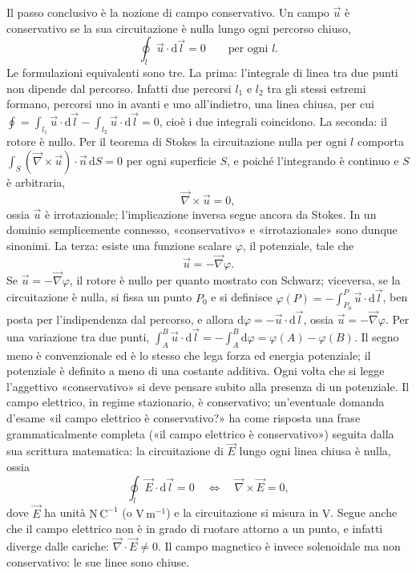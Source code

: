 \documentclass[11pt,a4paper]{article}
\newcommand{\nab}{\vec{\nabla}}
\newcommand{\dd}{\mathrm{d}}
\begin{document}
Il passo conclusivo è la nozione di campo conservativo. Un campo $\vec u$ è conservativo se la sua circuitazione è nulla lungo ogni percorso chiuso,
\[
\oint_l\vec u\cdot\dd\vec l=0\qquad\text{per ogni }l .
\]
Le formulazioni equivalenti sono tre. La prima: l'integrale di linea tra due punti non dipende dal percorso. Infatti due percorsi $l_1$ e $l_2$ tra gli stessi estremi formano, percorsi uno in avanti e uno all'indietro, una linea chiusa, per cui $\oint=\int_{l_1}\vec u\cdot\dd\vec l-\int_{l_2}\vec u\cdot\dd\vec l=0$, cioè i due integrali coincidono. La seconda: il rotore è nullo. Per il teorema di Stokes la circuitazione nulla per ogni $l$ comporta $\int_S(\nab\times\vec u)\cdot\vec n\,\dd S=0$ per ogni superficie $S$, e poiché l'integrando è continuo e $S$ è arbitraria,
\[
\nab\times\vec u=0 ,
\]
ossia $\vec u$ è irrotazionale; l'implicazione inversa segue ancora da Stokes. In un dominio semplicemente connesso, «conservativo» e «irrotazionale» sono dunque sinonimi. La terza: esiste una funzione scalare $\varphi$, il potenziale, tale che
\[
\vec u=-\nab\varphi .
\]
Se $\vec u=-\nab\varphi$, il rotore è nullo per quanto mostrato con Schwarz; viceversa, se la circuitazione è nulla, si fissa un punto $P_0$ e si definisce $\varphi(P)=-\int_{P_0}^{P}\vec u\cdot\dd\vec l$, ben posta per l'indipendenza dal percorso, e allora $\dd\varphi=-\vec u\cdot\dd\vec l$, ossia $\vec u=-\nab\varphi$. Per una variazione tra due punti, $\int_A^B\vec u\cdot\dd\vec l=-\int_A^B\dd\varphi=\varphi(A)-\varphi(B)$. Il segno meno è convenzionale ed è lo stesso che lega forza ed energia potenziale; il potenziale è definito a meno di una costante additiva. Ogni volta che si legge l'aggettivo «conservativo» si deve pensare subito alla presenza di un potenziale. Il campo elettrico, in regime stazionario, è conservativo; un'eventuale domanda d'esame «il campo elettrico è conservativo?» ha come risposta una frase grammaticalmente completa («il campo elettrico è conservativo») seguita dalla sua scrittura matematica: la circuitazione di $\vec E$ lungo ogni linea chiusa è nulla, ossia
\[
\oint_l\vec E\cdot\dd\vec l=0\quad\Longleftrightarrow\quad\nab\times\vec E=0 ,
\]
dove $\vec E$ ha unità $\mathrm{N\,C^{-1}}$ (o $\mathrm{V\,m^{-1}}$) e la circuitazione si misura in $\mathrm{V}$. Segue anche che il campo elettrico non è in grado di ruotare attorno a un punto, e infatti diverge dalle cariche: $\nab\cdot\vec E\neq0$. Il campo magnetico è invece solenoidale ma non conservativo: le sue linee sono chiuse.
\end{document}
